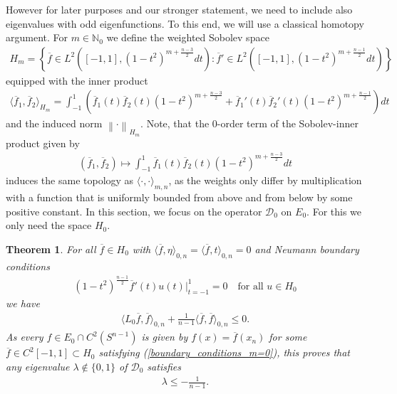 \documentclass[12pt,twoside]{amsart}
\numberwithin{satz}{section}
\newtheorem{theorem}[satz]{Theorem}
\theoremstyle{definition}
\numberwithin{equation}{section}
\newcommand\N{\mathbb{N}}
\newcommand{\norm}[1]{\left\lVert#1\right\rVert}
\begin{document}
	However for later purposes and our stronger statement, we need to include also eigenvalues with odd eigenfunctions. To this end, we will use a classical homotopy argument. For $m\in\N_0$ we define the weighted Sobolev space 
	\begin{align*}
		H_m=\left\{\overline{f}\in L^2([-1,1],(1-t^2)^{m+\frac{n-3}{2}}dt):\overline{f}'\in L^2\left([-1,1],(1-t^2)^{m+\frac{n-1}{2}}dt\right)\right\}
	\end{align*}
	equipped with the inner product
	\begin{align*}
		\langle \overline{f}_1,\overline{f}_2\rangle_{H_m}=\int_{-1}^1 \left(\overline{f}_1(t) \overline{f}_2(t) (1-t^2)^{m+\frac{n-3}{2}}+\overline{f}_1'(t)\overline{f}_2'(t)(1-t^2)^{m+\frac{n-1}{2}}\right)dt
	\end{align*}
	and the induced norm $\norm{\cdot}_{H_m}$. Note, that the $0$-order term of the Sobolev-inner product given by
	\begin{align*}
		(\overline{f}_1,\overline{f}_2)\mapsto \int_{-1}^1 \overline{f}_1(t) \overline{f}_2(t) (1-t^2)^{m+\frac{n-3}{2}}dt
	\end{align*}
	induces the same topology as $\langle\cdot,\cdot\rangle_{m,n}$, as the weights only differ by multiplication with a function that is uniformly bounded from above and from below by some positive constant. In this section, we focus on the operator $\mathcal{D}_0$ on $E_0$. For this we only need the space $H_0$.
	
	\begin{theorem}\label{theorem_m=0}
		For all $\overline{f}\in H_0$ with $\langle \overline{f},\eta\rangle_{0,n}=\langle \overline{f},t\rangle_{0,n}=0$ and Neumann boundary conditions
		\begin{align}\label{boundary_conditions_m=0}
			(1-t^2)^{\frac{n-1}{2}}\overline{f}'(t)u(t)\big|_{t=-1}^1=0 \quad \text{for all } u\in H_0
		\end{align}
		we have
		\begin{align*}
			\langle L_0\overline{f},\overline{f}\rangle_{0,n} + \frac{1}{n-1}\langle \overline{f},\overline{f}\rangle_{0,n}\leq 0.
		\end{align*}
		As every $f\in E_0\cap C^2(S^{n-1})$ is given by $f(x)=\overline{f}(x_n)$ for some $\overline{f}\in C^2[-1,1]\subset H_0$ satisfying (\ref{boundary_conditions_m=0}), this proves that any eigenvalue $\lambda\notin\{0,1\}$ of $\mathcal{D}_0$ satisfies
		\begin{align*}
			\lambda\leq -\frac{1}{n-1}.
		\end{align*}
	\end{theorem}
	
\end{document}
